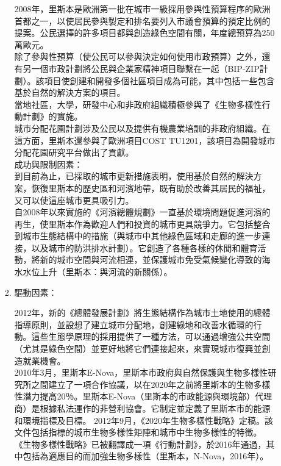 \documentclass[a4paper,12pt]{article}
\begin{document}
\begin{enumerate}
\begin{enumerate}
\begin{enumerate}
2008年，里斯本是歐洲第一批在城市一級採用參與性預算程序的歐洲首都之一，以使居民參與製定和排名要列入市議會預算的預定比例的提案。公民選擇的許多項目都與創造綠色空間有關，年度總預算為250萬歐元。\\

除了參與性預算（使公民可以參與決定如何使用市政預算）之外，還有另一個市政計劃將公民與企業家精神項目聯繫在一起（BIP-ZIP計劃）。該項目使創建和開發多個社區項目成為可能，其中包括一些包含基於自然的解決方案的項目。\\

當地社區，大學，研發中心和非政府組織積極參與了《生物多樣性行動計劃》的實施。\\

城市分配花園計劃涉及公民以及提供有機農業培訓的非政府組織。在這方面，里斯本還參與了歐洲項目COST TU1201，該項目為開發城市分配花園研究平台做出了貢獻。\\
成功與限制因素：\\

到目前為止，已採取的城市更新措施表明，使用基於自然的解決方案，恢復里斯本的歷史區和河濱地帶，既有助於改善其居民的福祉，又可以使這座城市更具吸引力。\\

自2008年以來實施的《河濱總體規劃》一直基於環境問題促進河濱的再生，使里斯本作為歡迎人們和投資的城市更具競爭力。它包括整合到城市生態結構中的措施（與城市中其他綠色區域和走廊的進一步連接，以及城市的防洪排水計劃）。它創造了各種各樣的休閒和體育活動，將新的城市空間與河流相連，並保護城市免受氣候變化導致的海水水位上升（里斯本：與河流的新關係）。\\
\item 驅動因素：
\label{sec:org84369da}

2012年，新的《總體發展計劃》將生態結構作為城市土地使用的總體指導原則，並設想了建立城市分配地，創建綠地和改善水循環的行動。這些生態學原理的採用提供了一種方法，可以通過增強公共空間（尤其是綠色空間）並更好地將它們連接起來，來實現城市復興並創造就業機會。\\

2010年3月，里斯本E-Nova，里斯本市政府與自然保護與生物多樣性研究所之間建立了一項合作協議，以在2020年之前將里斯本的生物多樣性潛力提高20％。里斯本E-Nova（里斯本的市政能源與環境部）代理商）是根據私法運作的非營利協會。它制定並定義了里斯本市的能源和環境指標及目標。 2012年9月，《2020年生物多樣性戰略》定稿。該文件包括指標的城市生物多樣性矩陣和城市中生物多樣性的特徵。 《生物多樣性戰略》已被翻譯成一項《行動計劃》，於2016年通過，其中包括為適應目的而加強生物多樣性（里斯本，N-Nova，2016年）。\\


\end{enumerate}
\end{enumerate}
\end{enumerate}
\end{document}
